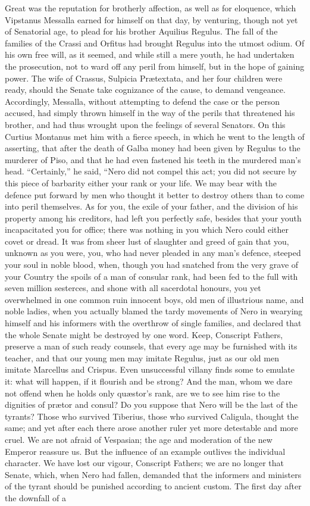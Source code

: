 Great was the reputation for brotherly affection, as well as for eloquence, which Vipstanus Messalla earned for himself on that day, by venturing, though not yet of Senatorial age, to plead for his brother Aquilius Regulus. The fall of the families of the Crassi and Orfitus had brought Regulus into the utmost odium. Of his own free will, as it seemed, and while still a mere youth, he had undertaken the prosecution, not to ward off any peril from himself, but in the hope of gaining power. The wife of Crassus, Sulpicia Prætextata, and her four children were ready, should the Senate take cognizance of the cause, to demand vengeance. Accordingly, Messalla, without attempting to defend the case or the person accused, had simply thrown himself in the way of the perils that threatened his brother, and had thus wrought upon the feelings of several Senators. On this Curtius Montanus met him with a fierce speech, in which he went to the length of asserting, that after the death of Galba money had been given by Regulus to the murderer of Piso, and that he had even fastened his teeth in the murdered man's head. ``Certainly,'' he said, ``Nero did not compel this act; you did not secure by this piece of barbarity either your rank or your life. We may bear with the defence put forward by men who thought it better to destroy others than to come into peril themselves. As for you, the exile of your father, and the division of his property among his creditors, had left you perfectly safe, besides that your youth incapacitated you for office; there was nothing in you which Nero could either covet or dread. It was from sheer lust of slaughter and greed of gain that you, unknown as you were, you, who had never pleaded in any man's defence, steeped your soul in noble blood, when, though you had snatched from the very grave of your Country the spoils of a man of consular rank, had been fed to the full with seven million sesterces, and shone with all sacerdotal honours, you yet overwhelmed in one common ruin innocent boys, old men of illustrious name, and noble ladies, when you actually blamed the tardy movements of Nero in wearying himself and his informers with the overthrow of single families, and declared that the whole Senate might be destroyed by one word. Keep, Conscript Fathers, preserve a man of such ready counsels, that every age may be furnished with its teacher, and that our young men may imitate Regulus, just as our old men imitate Marcellus and Crispus. Even unsuccessful villany finds some to emulate it: what will happen, if it flourish and be strong? And the man, whom we dare not offend when he holds only quæstor's rank, are we to see him rise to the dignities of prætor and consul? Do you suppose that Nero will be the last of the tyrants? Those who survived Tiberius, those who survived Caligula, thought the same; and yet after each there arose another ruler yet more detestable and more cruel. We are not afraid of Vespasian; the age and moderation of the new Emperor reassure us. But the influence of an example outlives the individual character. We have lost our vigour, Conscript Fathers; we are no longer that Senate, which, when Nero had fallen, demanded that the informers and ministers of the tyrant should be punished according to ancient custom. The first day after the downfall of a 